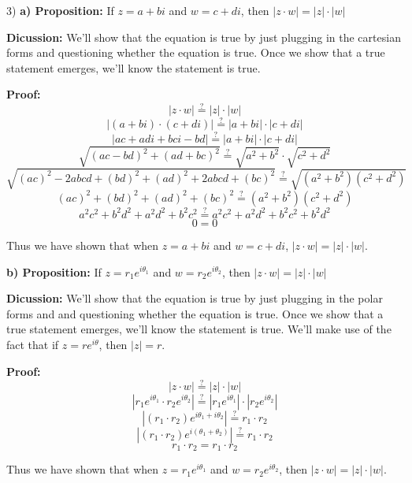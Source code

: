     \begin{paragraph}{3)}
        \textbf{a) Proposition:} If $z = a + bi$ and $w = c + di$, then $|z \cdot w| = |z| \cdot |w|$
        \spacing

        \textbf{Dicussion:} We'll show that the equation is true by 
        just plugging in the cartesian forms and questioning whether the 
        equation is true. Once we show that a true statement emerges, we'll know 
        the statement is true. 
        \spacing

        \textbf{Proof:}
        $$|z \cdot w| \stackrel{?}{=} |z| \cdot |w|$$
        $$|(a + bi) \cdot (c + di)| \stackrel{?}{=} |a + bi| \cdot |c + di|$$
        $$|ac + adi + bci - bd| \stackrel{?}{=} |a + bi| \cdot |c + di|$$
        $$\sqrt{(ac - bd)^2 + (ad + bc)^2} \stackrel{?}{=} \sqrt{a^2 + b^2} \cdot \sqrt{c^2 + d^2}$$
        $$\sqrt{(ac)^2 - 2abcd + (bd)^2 + (ad)^2 + 2abcd + (bc)^2} \stackrel{?}{=} \sqrt{(a^2 + b^2)(c^2 + d^2)}$$
        $$(ac)^2 + (bd)^2 + (ad)^2 + (bc)^2 \stackrel{?}{=} (a^2 + b^2)(c^2 + d^2)$$
        $$a^2c^2 + b^2d^2 + a^2d^2 + b^2c^2 \stackrel{?}{=} a^2c^2 + a^2d^2 + b^2c^2 + b^2d^2$$
        $$0 = 0$$
        
        Thus we have shown that when $z = a + bi$ and $w = c + di$,
        $|z \cdot w| = |z| \cdot |w|$.\\
        \proofEnd\bigskip

        \textbf{b) Proposition:} If $z =  r_1e^{i\theta_1}$ and $w = r_2e^{i\theta_2}$, then $|z \cdot w| = |z| \cdot |w|$
        \spacing

        \textbf{Dicussion:} We'll show that the equation is true by 
        just plugging in the polar forms and and questioning whether the 
        equation is true. Once we show that a true statement emerges, we'll know 
        the statement is true. We'll make use of the fact that if $z = re^{i\theta}$,
        then $|z| = r$.
        \spacing

        \textbf{Proof:}
        $$|z \cdot w| \stackrel{?}{=} |z| \cdot |w|$$
        $$|r_1e^{i\theta_1} \cdot r_2e^{i\theta_2}| \stackrel{?}{=} |r_1e^{i\theta_1}| \cdot |r_2e^{i\theta_2}|$$
        $$|(r_1 \cdot r_2)e^{i\theta_1 + i\theta_2}| \stackrel{?}{=} r_1 \cdot r_2$$
        $$|(r_1 \cdot r_2)e^{i (\theta_1 + \theta_2)}| \stackrel{?}{=} r_1 \cdot r_2$$
        $$r_1 \cdot r_2 = r_1 \cdot r_2$$

        Thus we have shown that when $z = r_1e^{i\theta_1}$ and 
        $w = r_2e^{i\theta_2}$, then $|z \cdot w| = |z| \cdot |w|$.\\
        \proofEnd
    \end{paragraph}

